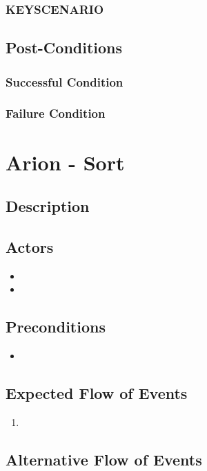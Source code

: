 \documentclass{scrreprt}
\begin{document}
    \subsection{KEYSCENARIO}

\section{Post-Conditions}
    \subsection{Successful Condition}
    
    \subsection{Failure Condition}


\chapter{Arion - Sort}

\section{Description}

\section{Actors}
\begin{itemize}
    \item 
    \item 
\end{itemize}

\section{Preconditions}
\begin{itemize}
    \item 
\end{itemize}

\section{Expected Flow of Events}
\begin{enumerate}[1.]
    \item 
\end{enumerate}

\section{Alternative Flow of Events}
\end{document}

